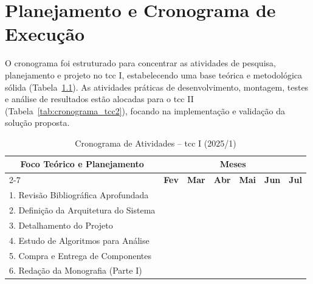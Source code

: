\documentclass[
	12pt,				%
	openright,			%
	twoside,			%
	a4paper,			%
	english,			%
	brazil				%
	]{abntex2}
\begin{document}
\chapter{Planejamento e Cronograma de Execução}

O cronograma foi estruturado para concentrar as atividades de pesquisa, planejamento e
projeto no \acrshort{tcc} I, estabelecendo uma base teórica e metodológica sólida
(Tabela~\ref{tab:cronograma_tcc1}). As atividades práticas de desenvolvimento, montagem,
testes e análise de resultados estão alocadas para o \acrshort{tcc} II
(Tabela~\ref{tab:cronograma_tcc2}), focando na implementação e validação da solução
proposta.

\begin{table}[!htb]
\centering
\caption{Cronograma de Atividades -- \acrshort{tcc} I (2025/1)}
\label{tab:cronograma_tcc1}
\begin{tabular}{|l|c|c|c|c|c|c|}
\hline
\multicolumn{1}{|c|}{\multirow{2}{*}{\textbf{Foco Teórico e Planejamento}}}
    & \multicolumn{6}{c|}{\textbf{Meses}} \\ \cline{2-7}
\multicolumn{1}{|c|}{} & \textbf{Fev} & \textbf{Mar} & \textbf{Abr} & \textbf{Mai}
    & \textbf{Jun} & \textbf{Jul} \\ \hline
1. Revisão Bibliográfica Aprofundada & \cellcolor[HTML]{C0C0C0}
    & \cellcolor[HTML]{C0C0C0} & \cellcolor[HTML]{C0C0C0} & & & \\ \hline
2. Definição da Arquitetura do Sistema & & & \cellcolor[HTML]{C0C0C0}
    & \cellcolor[HTML]{C0C0C0} & & \\ \hline
3. Detalhamento do Projeto & & & \cellcolor[HTML]{C0C0C0} & \cellcolor[HTML]{C0C0C0}
    & \cellcolor[HTML]{C0C0C0} & \\ \hline
4. Estudo de Algoritmos para Análise & & & & & \cellcolor[HTML]{C0C0C0}
    & \cellcolor[HTML]{C0C0C0}\\ \hline
5. Compra e Entrega de Componentes & & & & &  & \cellcolor[HTML]{C0C0C0} \\ \hline
6. Redação da Monografia (Parte I) & \cellcolor[HTML]{C0C0C0} & \cellcolor[HTML]{C0C0C0}
    & \cellcolor[HTML]{C0C0C0} & \cellcolor[HTML]{C0C0C0} & \cellcolor[HTML]{C0C0C0}
    & \cellcolor[HTML]{C0C0C0} \\ \hline
\end{tabular}
\end{table}
\end{document}
